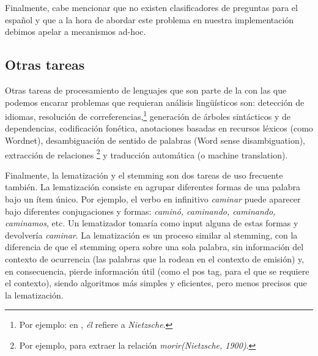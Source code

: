Finalmente, cabe mencionar que no existen clasificadores de preguntas para el español y que a la hora de abordar este problema en nuestra implementación debimos apelar a mecanismos ad-hoc.

\subsection{Otras tareas}
\label{subsec:otras-tareas-pnl}
Otras tareas de procesamiento de lenguajes que son parte de la  con las que podemos encarar problemas que requieran análisis lingüísticos son: detección de idiomas, resolución de correferencias,\footnote{Por ejemplo: en , \textit{él} refiere a \textit{Nietzsche}.} generación de árboles sintácticos y de dependencias, codificación fonética, anotaciones basadas en recursos léxicos (como Wordnet), desambiguación de sentido de palabras (Word sense disambiguation), extracción de relaciones \footnote{Por ejemplo, para  extraer la relación \textit{morir(Nietzsche, 1900)}.} y traducción automática (o machine translation).

Finalmente, la lematización y el stemming son dos tareas de uso frecuente también. La lematización consiste en agrupar diferentes formas de una palabra bajo un ítem único. Por ejemplo, el verbo en infinitivo \textit{caminar} puede aparecer bajo diferentes conjugaciones y formas: \textit{caminó, caminando, caminando, caminamos}, etc. Un lematizador tomaría como input alguna de estas formas y devolvería \textit{caminar}. La lematización es un proceso similar al stemming, con la diferencia de que el stemming opera sobre una sola palabra, sin información del contexto de ocurrencia (las palabras que la rodean en el contexto de emisión) y, en consecuencia, pierde información útil (como el pos tag, para el que se requiere el contexto), siendo algoritmos más simples y eficientes, pero menos precisos que la lematización.